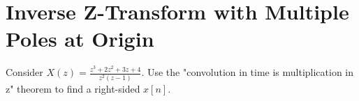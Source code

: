 \documentclass[11pt]{article}
\begin{document}
\section{Inverse Z-Transform with Multiple Poles at Origin}

Consider $X(z) = \frac{z^3+2z^2+3z+4}{z^2(z-1)}$. Use the "convolution in time is multiplication in z" theorem to find a right-sided $x[n]$.

%
%
%
\end{document}
